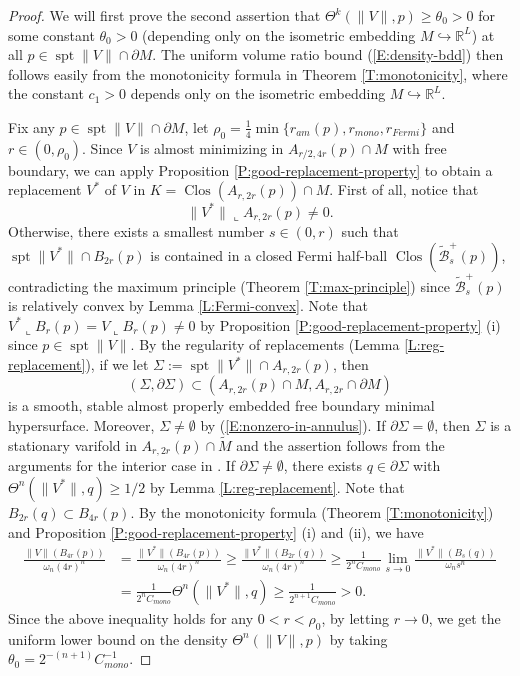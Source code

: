 \documentclass[10pt]{amsart}
\theoremstyle{definition}
\theoremstyle{remark}
\numberwithin{equation}{section}
\newcommand{\R}{\mathbb{R}}
\newcommand{\lc}{\llcorner}
\newcommand{\Si}{\Sigma}
\newcommand{\tM}{\widetilde{M}}
\newcommand{\tBcal}{\widetilde{\mathcal{B}}}
\newcommand{\spt}{\operatorname{spt}}
\newcommand{\Clos}{\operatorname{Clos}}
\begin{document}
\begin{proof}
We will first prove the second assertion that $\Theta^k(\|V\|,p) \geq \theta_0>0$ for some constant $\theta_0>0$ (depending only on the isometric embedding $M \hookrightarrow \R^L$) at all $p \in \spt\|V\| \cap \partial M$. The uniform volume ratio bound (\ref{E:density-bdd}) then follows easily from the monotonicity formula in Theorem \ref{T:monotonicity}, where the constant $c_1>0$ depends only on the isometric embedding $M \hookrightarrow \mathbb{R}^L$. 

Fix any $p \in \spt \|V\| \cap \partial M$, let $\rho_0=\frac{1}{4}\min\{r_{am}(p),r_{mono},r_{Fermi}\}$ and $r \in (0,\rho_0)$. Since $V$ is almost minimizing in $A_{r/2,4r}(p) \cap M$ with free boundary, we can apply Proposition \ref{P:good-replacement-property} to obtain a replacement $V^*$ of $V$ in $K=\Clos(A_{r,2r}(p)) \cap M$. First of all, notice that 
\begin{equation}
\label{E:nonzero-in-annulus}
\|V^*\| \lc A_{r,2r}(p) \neq 0.
\end{equation}
Otherwise, there exists a smallest number $s \in (0,r)$ such that $\spt \|V^*\| \cap B_{2r}(p)$ is contained in a closed Fermi half-ball $\Clos(\tBcal^+_s(p))$, contradicting the maximum principle (Theorem \ref{T:max-principle}) since $\tBcal^+_s(p)$ is relatively convex by Lemma \ref{L:Fermi-convex}. Note that $V^* \lc B_r(p)=V \lc B_r(p) \neq 0$ by Proposition \ref{P:good-replacement-property} (i) since $p \in \spt \|V\|$. By the regularity of replacements (Lemma \ref{L:reg-replacement}), if we let $\Si:=\spt \|V^*\| \cap A_{r,2r}(p)$, then 
\[ (\Si, \partial \Si) \subset (A_{r,2r}(p) \cap M, A_{r,2r} \cap \partial M) \]
is a smooth, stable almost properly embedded free boundary minimal hypersurface. Moreover, $\Sigma \neq \emptyset$ by (\ref{E:nonzero-in-annulus}). If $\partial \Sigma =\emptyset$, then $\Sigma$ is a stationary varifold in $A_{r,2r}(p) \cap \tM$ and the assertion follows from the arguments for the interior case in \cite[3.13]{Pitts}. If $\partial \Sigma \neq \emptyset$, there exists $q \in \partial \Sigma$ with $\Theta^n(\|V^*\|,q) \geq 1/2$ by Lemma \ref{L:reg-replacement}. Note that $B_{2r}(q) \subset B_{4r}(p)$. By the monotonicity formula (Theorem \ref{T:monotonicity}) and Proposition \ref{P:good-replacement-property} (i) and (ii), we have
\begin{displaymath}
\begin{split}
\frac{\|V\|(B_{4r}(p))}{\omega_n (4r)^n} & = \frac{\|V^*\|(B_{4r}(p))}{\omega_n (4r)^n} \geq \frac{\|V^*\|(B_{2r}(q))}{\omega_n (4r)^n} \geq \frac{1}{2^nC_{mono}} \lim_{s\rightarrow 0}\frac{\|V^*\|(B_{s}(q))}{\omega_n s^n}\\
                                             & = \frac{1}{2^nC_{mono}} \Theta^n(\|V^*\|,q) \geq \frac{1}{2^{n+1}C_{mono}}>0.
\end{split}
\end{displaymath}
Since the above inequality holds for any $0<r < \rho_0$, by letting $r \to 0$, we get the uniform lower bound on the density $\Theta^n(\|V\|,p)$ by taking $\theta_0=2^{-(n+1)}C^{-1}_{mono}$.
\end{proof}
\end{document}
